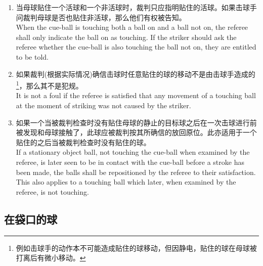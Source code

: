\begin{enumerate}[label=(\alph*)]
    \item 当母球贴住一个活球和一个非活球时，裁判只应指明贴住的活球。如果击球手问裁判母球是否也贴住非活球，那么他们有权被告知。\\
    When the cue-ball is touching both a ball on and a ball not on, the referee shall only indicate the ball on as touching. If the striker should ask the referee whether the cue-ball is also touching the ball not on, they are entitled to be told.
    \item 如果裁判(根据实际情况)确信击球时任意贴住的球的移动不是由击球手造成的\footnote{例如击球手的动作本不可能造成贴住的球移动，但因静电，贴住的球在母球被打离后有微小移动。}，那么其不是犯规。\\
    It is not a foul if the referee is satisfied that any movement of a touching ball at the moment of striking was not caused by the striker.
    \item 如果一个当被裁判检查时没有贴住母球的静止的目标球之后在一次击球进行前被发现和母球接触了，此球应被裁判按其所确信的放回原位。此亦适用于一个贴住的之后当被裁判检查时没有贴住的球。\\
    If a stationary object ball, not touching the cue-ball when examined by the referee, is later seen to be in contact with the cue-ball before a stroke has been made, the balls shall be repositioned by the referee to their satisfaction. This also applies to a touching ball which later, when examined by the referee, is not touching.
\end{enumerate}

\subsection{在袋口的球}\label{2239}

